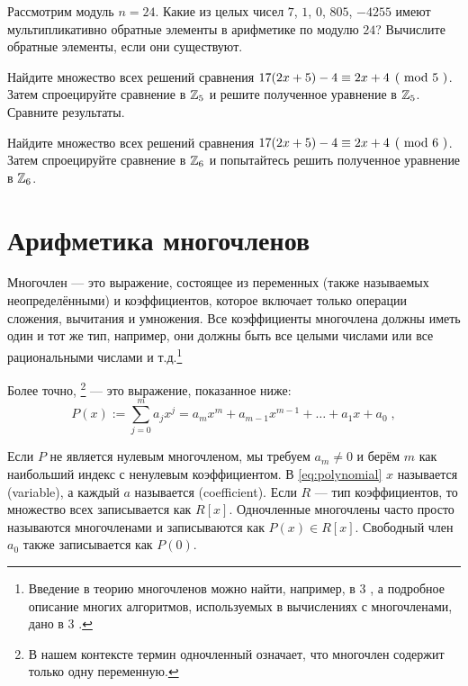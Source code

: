 \begin{exercise}
Рассмотрим модуль $n=24$. Какие из целых чисел $7$, $1$, $0$, $805$, $-4255$ имеют мультипликативно обратные элементы в арифметике по модулю $24$? Вычислите обратные элементы, если они существуют.
\end{exercise}
\begin{exercise}
Найдите множество всех решений сравнения $\kongru{17(2x+5)-4}{2x+4}{5}$. Затем спроецируйте сравнение в $\mathbb{Z}_5$ и решите полученное уравнение в $\mathbb{Z}_5$. Сравните результаты.
\end{exercise}
\begin{exercise}
Найдите множество всех решений сравнения $\kongru{17(2x+5)-4}{2x+4}{6}$. Затем спроецируйте сравнение в $\mathbb{Z}_6$ и попытайтесь решить полученное уравнение в $\mathbb{Z}_6$.
\end{exercise}
\section{Арифметика многочленов}
\label{sec:polynomial_arithmetics}
Многочлен — это выражение, состоящее из переменных (также называемых неопределёнными) и коэффициентов, которое включает только операции сложения, вычитания и умножения. Все коэффициенты многочлена должны иметь один и тот же тип, например, они должны быть все целыми числами или все рациональными числами и т.д.\footnote{Введение в теорию многочленов можно найти, например, в \chaptname{} 3 \cite{mignotte-1992}, а подробное описание многих алгоритмов, используемых в вычислениях с многочленами, дано в \chaptname{} 3 \cite{cohen-2010}.}

Более точно, \footnote{В нашем контексте термин одночленный означает, что многочлен содержит только одну переменную.} — это выражение, показанное ниже:
\begin{equation}\label{eq:polynomial}
P(x) := \sum _{j = 0} ^{m}{a} _{j}{x} ^{j} ={a} _{m}x^m +{a} _{m-1} x^{m-1} + \dots + a_1 x + a_0 \;,
\end{equation}

Если $P$ не является нулевым многочленом, мы требуем $a_m\neq 0$ и берём $m$ как наибольший индекс с ненулевым коэффициентом. В \eqref{eq:polynomial} $x$ называется  (variable), а каждый $ a$ называется  (coefficient). Если $R$ — тип коэффициентов, то множество всех  записывается как $R[x]$. Одночленные многочлены часто просто называются многочленами и записываются как $ P (x) \in R[x]$. Свободный член $a_0$ также записывается как $ P(0)$.

